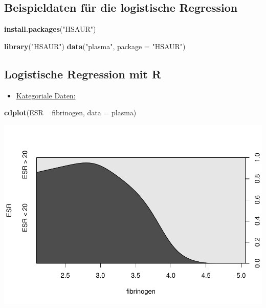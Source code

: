 \documentclass[]{article}
\newenvironment{Shaded}{\begin{snugshade}}{\end{snugshade}}
\newcommand{\KeywordTok}[1]{\textcolor[rgb]{0.13,0.29,0.53}{\textbf{{#1}}}}
\newcommand{\DataTypeTok}[1]{\textcolor[rgb]{0.13,0.29,0.53}{{#1}}}
\newcommand{\StringTok}[1]{\textcolor[rgb]{0.31,0.60,0.02}{{#1}}}
\newcommand{\NormalTok}[1]{{#1}}
\providecommand{\tightlist}{%
  \setlength{\itemsep}{0pt}\setlength{\parskip}{0pt}}
\begin{document}
\subsection{Beispieldaten für die logistische
Regression}\label{beispieldaten-fur-die-logistische-regression}

\begin{Shaded}
\begin{Highlighting}[]
\KeywordTok{install.packages}\NormalTok{(}\StringTok{"HSAUR"}\NormalTok{)}
\end{Highlighting}
\end{Shaded}

\begin{Shaded}
\begin{Highlighting}[]
\KeywordTok{library}\NormalTok{(}\StringTok{"HSAUR"}\NormalTok{)}
\KeywordTok{data}\NormalTok{(}\StringTok{"plasma"}\NormalTok{, }\DataTypeTok{package =} \StringTok{"HSAUR"}\NormalTok{)}
\end{Highlighting}
\end{Shaded}

\subsection{Logistische Regression mit
R}\label{logistische-regression-mit-r}

\begin{itemize}
\tightlist
\item
  \href{http://homepage.univie.ac.at/herbert.nagel/KategorialeDaten.pdf}{Kategoriale
  Daten:}
\end{itemize}

\begin{Shaded}
\begin{Highlighting}[]
\KeywordTok{cdplot}\NormalTok{(ESR ~}\StringTok{ }\NormalTok{fibrinogen, }\DataTypeTok{data =} \NormalTok{plasma)}
\end{Highlighting}
\end{Shaded}

\includegraphics{Intro_Datenanalyse1_files/figure-latex/unnamed-chunk-198-1.pdf}
\end{document}
